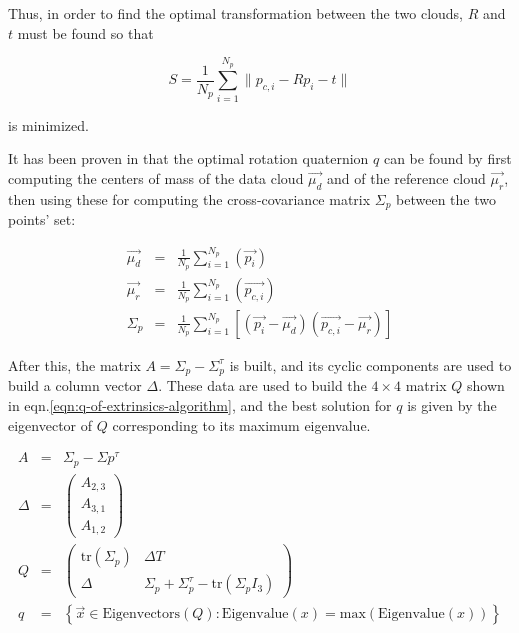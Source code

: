 Thus, in order to find the optimal transformation between the two clouds, $R$
and $t$ must be found so that

\begin{equation}
  S=\frac{1}{N_p}\sum_{i=1}^{N_p}\lVert p_{c,i} - Rp_i -t  \rVert
\end{equation}

is minimized.

It has been proven in \cite{extrinsics-algorithm}that the optimal rotation
quaternion $q$ can be found by first computing the centers of mass of the data
cloud $\vec{\mu_d}$ and of the reference cloud $\vec{\mu_r}$, then using these for
computing the cross-covariance matrix $\Sigma_{p}$ between the two points' set:

\begin{eqnarray}
  \vec{\mu_d} & = &  \frac{1}{N_p}\sum_{i=1}^{N_p}\left(\vec{p_i}\right) \\
  \vec{\mu_r} & = &  \frac{1}{N_p}\sum_{i=1}^{N_p}\left(\vec{p_{c,i}}\right) \\
  \Sigma_{p} & = &
  \frac{1}{N_p}\sum_{i=1}^{N_p}\left[\left(\vec{p_i}-\vec{\mu_d}\right)\left(\vec{p_{c,i}}-\vec{\mu_r}\right)\right]
\end{eqnarray}

After this, the matrix $A=\Sigma_{p}-\Sigma_{p}^{\tau}$ is built, and its cyclic
components are used to build a column vector $\Delta$. These data are used to
build the $4 \times 4$ matrix $Q$ shown in
eqn.\ref{eqn:q-of-extrinsics-algorithm}, and the best solution for $q$ is given
by the eigenvector of $Q$ corresponding to its maximum eigenvalue.

\begin{eqnarray}
  A & = & \Sigma_{p}-\Sigma{p}^{\tau} \\
  \Delta & = & \begin{pmatrix}A_{2,3}\\A_{3,1}\\A_{1,2}\end{pmatrix} \\
  Q & = & \begin{pmatrix}
  \text{tr}(\Sigma_{p}) & \Delta T \\
  \Delta & \Sigma_{p}+\Sigma_{p}^{\tau}-\text{tr}(\Sigma_{p}I_{3}) 
\end{pmatrix} \label{eqn:q-of-extrinsics-algorithm}\\
  q & = & \left\{ \vec{x} \in \text{Eigenvectors}(Q) :
  \text{Eigenvalue}(x)=\text{max}\left(\text{Eigenvalue}(x)\right) \right\}
\end{eqnarray}


